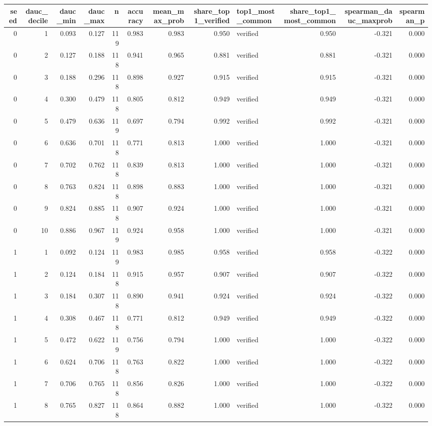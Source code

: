 \begin{tabular}{rrrrrrrrlrrr}
\toprule
seed & dauc_decile & dauc_min & dauc_max & n & accuracy & mean_max_prob & share_top1_verified & top1_most_common & share_top1_most_common & spearman_dauc_maxprob & spearman_p \\
\midrule
0 & 1 & 0.093 & 0.127 & 119 & 0.983 & 0.983 & 0.950 & verified & 0.950 & -0.321 & 0.000 \\
0 & 2 & 0.127 & 0.188 & 118 & 0.941 & 0.965 & 0.881 & verified & 0.881 & -0.321 & 0.000 \\
0 & 3 & 0.188 & 0.296 & 118 & 0.898 & 0.927 & 0.915 & verified & 0.915 & -0.321 & 0.000 \\
0 & 4 & 0.300 & 0.479 & 118 & 0.805 & 0.812 & 0.949 & verified & 0.949 & -0.321 & 0.000 \\
0 & 5 & 0.479 & 0.636 & 119 & 0.697 & 0.794 & 0.992 & verified & 0.992 & -0.321 & 0.000 \\
0 & 6 & 0.636 & 0.701 & 118 & 0.771 & 0.813 & 1.000 & verified & 1.000 & -0.321 & 0.000 \\
0 & 7 & 0.702 & 0.762 & 118 & 0.839 & 0.813 & 1.000 & verified & 1.000 & -0.321 & 0.000 \\
0 & 8 & 0.763 & 0.824 & 118 & 0.898 & 0.883 & 1.000 & verified & 1.000 & -0.321 & 0.000 \\
0 & 9 & 0.824 & 0.885 & 118 & 0.907 & 0.924 & 1.000 & verified & 1.000 & -0.321 & 0.000 \\
0 & 10 & 0.886 & 0.967 & 119 & 0.924 & 0.958 & 1.000 & verified & 1.000 & -0.321 & 0.000 \\
1 & 1 & 0.092 & 0.124 & 119 & 0.983 & 0.985 & 0.958 & verified & 0.958 & -0.322 & 0.000 \\
1 & 2 & 0.124 & 0.184 & 118 & 0.915 & 0.957 & 0.907 & verified & 0.907 & -0.322 & 0.000 \\
1 & 3 & 0.184 & 0.307 & 118 & 0.890 & 0.941 & 0.924 & verified & 0.924 & -0.322 & 0.000 \\
1 & 4 & 0.308 & 0.467 & 118 & 0.771 & 0.812 & 0.949 & verified & 0.949 & -0.322 & 0.000 \\
1 & 5 & 0.472 & 0.622 & 119 & 0.756 & 0.794 & 1.000 & verified & 1.000 & -0.322 & 0.000 \\
1 & 6 & 0.624 & 0.706 & 118 & 0.763 & 0.822 & 1.000 & verified & 1.000 & -0.322 & 0.000 \\
1 & 7 & 0.706 & 0.765 & 118 & 0.856 & 0.826 & 1.000 & verified & 1.000 & -0.322 & 0.000 \\
1 & 8 & 0.765 & 0.827 & 118 & 0.864 & 0.882 & 1.000 & verified & 1.000 & -0.322 & 0.000 \\

\end{tabular}
